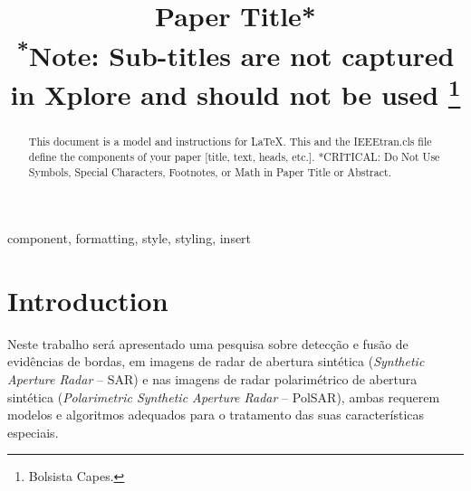 \documentclass[conference]{IEEEtran}
\begin{document}
\title{Paper Title*\\
{\footnotesize \textsuperscript{*}Note: Sub-titles are not captured in Xplore and
should not be used}
\thanks{Bolsista Capes.}
}

\author{
\and
{}
\and
{}
}

\maketitle

\begin{abstract}
This document is a model and instructions for \LaTeX.
This and the IEEEtran.cls file define the components of your paper [title, text, heads, etc.]. *CRITICAL: Do Not Use Symbols, Special Characters, Footnotes, 
or Math in Paper Title or Abstract.
\end{abstract}

\begin{IEEEkeywords}
component, formatting, style, styling, insert
\end{IEEEkeywords}

\section{Introduction}\label{sec_01}
Neste trabalho será apresentado uma pesquisa sobre detecção e fusão de evidências de bordas, em imagens de radar de abertura sintética (\textit{Synthetic Aperture Radar} -- SAR) e nas imagens de radar polarimétrico de abertura sintética (\textit{Polarimetric Synthetic Aperture Radar} -- PolSAR), ambas requerem modelos e algoritmos adequados para o tratamento das suas características especiais.
\end{document}
